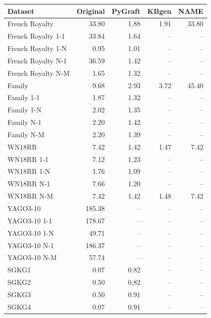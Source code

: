 \begin{tabular}{lrrrr}
\toprule
Dataset & Original & PyGraft & KBgen & NAME \\
\midrule
French Royalty & 33.80 & 1.88 & 1.91 & 33.80 \\
French Royalty 1-1 & 33.84 & 1.64 & – & – \\
French Royalty 1-N & 0.95 & 1.01 & – & – \\
French Royalty N-1 & 36.59 & 1.42 & – & – \\
French Royalty N-M & 1.65 & 1.32 & – & – \\
\midrule
Family & 9.68 & 2.93 & 3.72 & 45.40 \\
Family 1-1 & 1.87 & 1.32 & – & – \\
Family 1-N & 2.02 & 1.35 & – & – \\
Family N-1 & 2.20 & 1.42 & – & – \\
Family N-M & 2.20 & 1.39 & – & – \\
\midrule
WN18RR & 7.42 & 1.42 & 1.47 & 7.42 \\
WN18RR 1-1 & 7.12 & 1.23 & – & – \\
WN18RR 1-N & 1.76 & 1.09 & – & – \\
WN18RR N-1 & 7.66 & 1.20 & – & – \\
WN18RR N-M & 7.42 & 1.42 & 1.48 & 7.42 \\
\midrule
YAGO3-10 & 185.38 & – & – & – \\
YAGO3-10 1-1 & 178.67 & – & – & – \\
YAGO3-10 1-N & 49.71 & – & – & – \\
YAGO3-10 N-1 & 186.37 & – & – & – \\
YAGO3-10 N-M & 57.74 & – & – & – \\
\midrule
SGKG1 & 0.07 & 0.82 & – & – \\
SGKG2 & 0.50 & 0.82 & – & – \\
SGKG3 & 0.50 & 0.91 & – & – \\
SGKG4 & 0.07 & 0.91 & – & – \\
\bottomrule
\end{tabular}
